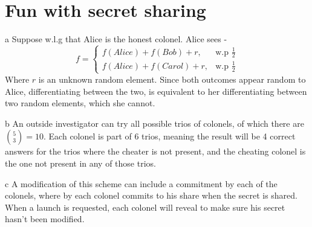 \documentclass{article}
\begin{document}
\section{Fun with secret sharing}
\begin{paragraph}
    a Suppose w.l.g that Alice is the honest colonel. Alice sees - 
    \begin{equation*}
    f =
        \begin{cases}
            f(Alice) + f(Bob) + r, & \mbox{w.p } \frac{1}{2} \\
            f(Alice) + f(Carol) + r, & \mbox{w.p } \frac{1}{2}
        \end{cases}
    \end{equation*}
    Where $r$ is an unknown random element. Since both outcomes appear random to Alice,
    differentiating between the two, is equivalent to her differentiating between two random elements,
    which she cannot.
\end{paragraph}

\begin{paragraph}
    b An outside investigator can try all possible trios of colonels, of which there are
    $\binom{5}{3} = 10$. Each colonel is part of 6 trios, meaning the result will be 4 correct
    answers for the trios where the cheater is not present, and the cheating colonel is the one
    not present in any of those trios.
\end{paragraph}

\begin{paragraph}
    c A modification of this scheme can include a commitment by each of the colonels, where by
    each colonel commits to his share when the secret is shared. When a launch is requested,
    each colonel will reveal to make sure his secret hasn't been modified.
\end{paragraph}
\end{document}

